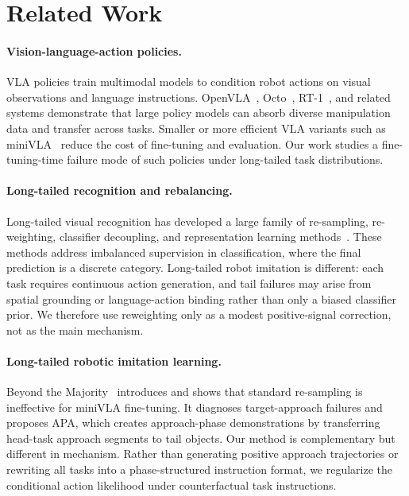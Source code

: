 \section{Related Work}

\paragraph{Vision-language-action policies.}
VLA policies train multimodal models to condition robot actions on visual observations and language instructions. OpenVLA~\cite{kim2024openvla}, Octo~\cite{octo2024}, RT-1~\cite{brohan2022rt1}, and related systems demonstrate that large policy models can absorb diverse manipulation data and transfer across tasks. Smaller or more efficient VLA variants such as miniVLA~\cite{belkhale2024minivla} reduce the cost of fine-tuning and evaluation. Our work studies a fine-tuning-time failure mode of such policies under long-tailed task distributions.

\paragraph{Long-tailed recognition and rebalancing.}
Long-tailed visual recognition has developed a large family of re-sampling, re-weighting, classifier decoupling, and representation learning methods~\cite{zhang2023deep,kang2019decoupling,cui2019classbalanced}. These methods address imbalanced supervision in classification, where the final prediction is a discrete category. Long-tailed robot imitation is different: each task requires continuous action generation, and tail failures may arise from spatial grounding or language-action binding rather than only a biased classifier prior. We therefore use reweighting only as a modest positive-signal correction, not as the main mechanism.

\paragraph{Long-tailed robotic imitation learning.}
Beyond the Majority~\cite{zhu2026beyond} introduces \liberocorelt{} and shows that standard re-sampling is ineffective for miniVLA fine-tuning. It diagnoses target-approach failures and proposes APA, which creates approach-phase demonstrations by transferring head-task approach segments to tail objects. Our method is complementary but different in mechanism. Rather than generating positive approach trajectories or rewriting all tasks into a phase-structured instruction format, we regularize the conditional action likelihood under counterfactual task instructions.

